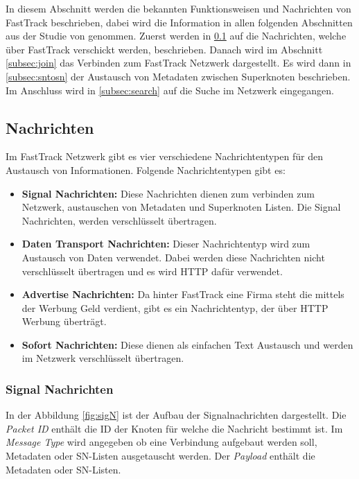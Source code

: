 In diesem Abschnitt werden die bekannten Funktionsweisen und Nachrichten von FastTrack beschrieben, dabei wird die Information in allen folgenden Abschnitten aus der Studie \cite{liang2006fasttrack} von genommen.
Zuerst werden in \ref{subsec:nachricht} auf die Nachrichten, welche über FastTrack verschickt werden, beschrieben.
Danach wird im Abschnitt \ref{subsec:join} das Verbinden zum FastTrack Netzwerk dargestellt.
Es wird dann in \ref{subsec:sntosn} der Austausch von Metadaten zwischen Superknoten beschrieben.
Im Anschluss wird in \ref{subsec:search} auf die Suche im Netzwerk eingegangen.

\subsection{Nachrichten}
\label{subsec:nachricht}

Im FastTrack Netzwerk gibt es vier verschiedene Nachrichtentypen für den Austausch von Informationen. Folgende Nachrichtentypen gibt es:

\begin{itemize}
\item[1.] \textbf{Signal Nachrichten:} Diese Nachrichten dienen zum verbinden zum Netzwerk, austauschen von Metadaten und Superknoten Listen.
Die Signal Nachrichten, werden verschlüsselt übertragen.
\item[2.] \textbf{Daten Transport Nachrichten:} Dieser Nachrichtentyp wird zum Austausch von Daten verwendet. Dabei werden diese Nachrichten nicht verschlüsselt übertragen und es wird HTTP dafür verwendet.
\item[3.] \textbf{Advertise Nachrichten:} Da hinter FastTrack eine Firma steht die mittels der Werbung Geld verdient, gibt es ein Nachrichtentyp, der über HTTP Werbung überträgt.
\item[4.] \textbf{Sofort Nachrichten:} Diese dienen als einfachen Text Austausch und werden im Netzwerk verschlüsselt übertragen.
\end{itemize} 

\subsubsection{Signal Nachrichten}
\label{subsubsec:sigN}

In der Abbildung \ref{fig:sigN} ist der Aufbau der Signalnachrichten dargestellt.
Die \textit{Packet ID} enthält die ID der Knoten für welche die Nachricht bestimmt ist.
Im \textit{Message Type} wird angegeben ob eine Verbindung aufgebaut werden soll, Metadaten oder SN-Listen ausgetauscht werden.
Der \textit{Payload} enthält die Metadaten oder SN-Listen.

